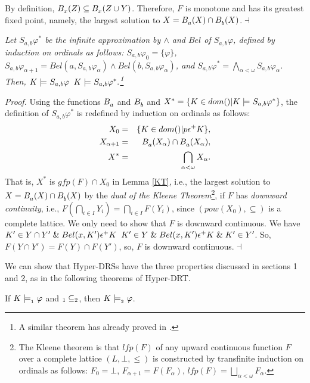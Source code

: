 By definition, $B_x^{}(Z)\subseteq B_x^{}(Z\cup Y)$.
Therefore, $F$ is monotone and has its greatest fixed point,
namely, the largest solution to $X=B_a^{}(X)\cap B_b^{}(X)$.$\dashv$
\begin{LEM}\label{appro}\sl
Let $S_{a,b}\varphi^{\ast}$ be the infinite approximation by $\wedge$ and $Bel$ of $S_{a,b}\varphi$, defined by induction on ordinals as follows: $S_{a,b}\varphi_{0}=\{\varphi\}$, $S_{a,b}\varphi_{\alpha+1}=Bel(a,S_{a,b}\varphi_{\alpha})\wedge Bel(b,S_{a,b}\varphi_{\alpha})$, and $S_{a,b}\varphi^{\ast}=\bigwedge_{\alpha<\omega}S_{a,b}\varphi_{\alpha}$.
Then,
$K\models_{}S_{a,b}\varphi\; \;K\models_{}S_{a,b}\varphi^{\ast}.$\<\footnote{
A similar theorem has already proved in \cite{Lis95}.}
\end{LEM}
{\it Proof.} Using the functions $B_a^{}$ and $B_b^{}$ and $X^{\ast}=\{K\in dom()|K\models_{}S_{a,b}\varphi^{\ast}\}$, the definition of $S_{a,b}\varphi^{\ast}$ is redefined by induction on ordinals as follows:
\begin{eqnarray*}
X_0&=&\{K\in dom()|p\epsilon^+_{}K\},\\
X_{\alpha+1}&=&B_a^{}(X_{\alpha})\cap B_a^{}(X_{\alpha}),\\
X^{\ast}&=&\bigcap_{\alpha<\omega}X_{\alpha}.
\end{eqnarray*}
That is, $X^{\ast}$ is $gfp(F)\cap X_0$ in Lemma \ref{KT}, i.e., the largest solution to $X=B_a^{}(X)\cap B_b^{}(X)$ by the {\it dual of the Kleene Theorem}\<\footnote{
The Kleene theorem \cite{Llo87} is that $lfp(F)$ of any upward continuous function $F$ over a complete lattice $(L,\bot,\leq)$ is constructed by transfinite induction on ordinals as follows: $F_0=\bot$, $F_{\alpha+1}=F(F_{\alpha})$, $lfp(F)=\bigsqcup_{\alpha<\omega}F_{\alpha}$.},
if $F$ has {\it downward continuity}, i.e., $F(\bigcap_{i\in I}Y_i)=\bigcap_{i\in I}F(Y_i)$,
since $(pow(X_0),\subseteq)$ is a complete lattice.
We only need to show that $F$ is downward continuous.
We have $K'\in Y\cap Y'\; \&\; Bel(x,K')\epsilon^+_{}K\; \; K'\in Y \;\&\; Bel(x,K')\epsilon^+K\; \&\; K'\in Y'$.
So, $F(Y\cap Y')=F(Y)\cap F(Y')$, so, $F$ is downward continuous.$\dashv$
\par
We can show that Hyper-DRSs have the three properties discussed in sections 1 and 2, as in the following theorems of Hyper-DRT.
\begin{LEM}\label{sub}
If $K\models_{_1}\varphi$ and $_1\subseteq _2$, then $K\models_{_2}\varphi$.
\end{LEM}
\par
